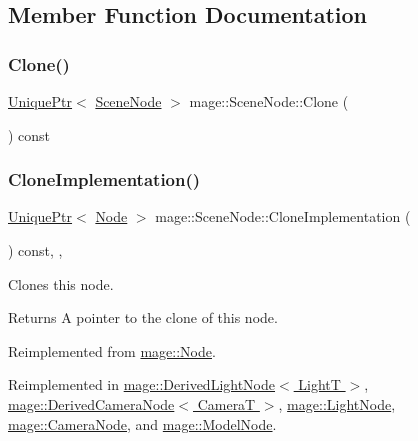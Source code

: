 \subsection{Member Function Documentation}
\hypertarget{classmage_1_1_scene_node_ae92f68ce03011b1c1d71421f077a00f8}{}\label{classmage_1_1_scene_node_ae92f68ce03011b1c1d71421f077a00f8} 
\subsubsection{\texorpdfstring{Clone()}{Clone()}}
{\footnotesize\ttfamily \hyperlink{namespacemage_a8c307fbcc33bce9b7f2aa4c26c3b95cf}{Unique\+Ptr}$<$ \hyperlink{classmage_1_1_scene_node}{Scene\+Node} $>$ mage\+::\+Scene\+Node\+::\+Clone (\begin{DoxyParamCaption}{ }\end{DoxyParamCaption}) const}

\hypertarget{classmage_1_1_scene_node_a42d0d53ab804d38ebd584d2de6490eeb}{}\label{classmage_1_1_scene_node_a42d0d53ab804d38ebd584d2de6490eeb} 
\subsubsection{\texorpdfstring{Clone\+Implementation()}{CloneImplementation()}}
{\footnotesize\ttfamily \hyperlink{namespacemage_a8c307fbcc33bce9b7f2aa4c26c3b95cf}{Unique\+Ptr}$<$ \hyperlink{classmage_1_1_node}{Node} $>$ mage\+::\+Scene\+Node\+::\+Clone\+Implementation (\begin{DoxyParamCaption}{ }\end{DoxyParamCaption}) const\hspace{0.3cm}{\ttfamily [override]}, {\ttfamily [private]}, {\ttfamily [virtual]}}

Clones this node.

\begin{DoxyReturn}{Returns}
A pointer to the clone of this node. 
\end{DoxyReturn}


Reimplemented from \hyperlink{classmage_1_1_node_a71a4763bfd4cba5653488b490e61dc8f}{mage\+::\+Node}.



Reimplemented in \hyperlink{classmage_1_1_derived_light_node_acf8858989780bf45a45c55a7c5564314}{mage\+::\+Derived\+Light\+Node$<$ Light\+T $>$}, \hyperlink{classmage_1_1_derived_camera_node_aa965751029ebd6b41d3805b499a8304e}{mage\+::\+Derived\+Camera\+Node$<$ Camera\+T $>$}, \hyperlink{classmage_1_1_light_node_aea97601d0a4b8073a1c655ca334af242}{mage\+::\+Light\+Node}, \hyperlink{classmage_1_1_camera_node_a002d3a2b41cda270a26ca5d8f3a17f55}{mage\+::\+Camera\+Node}, and \hyperlink{classmage_1_1_model_node_a34146201083015276b38240af307417f}{mage\+::\+Model\+Node}.

